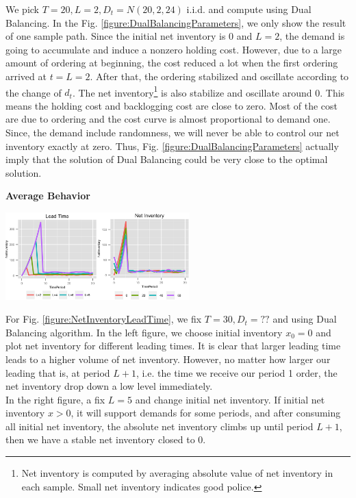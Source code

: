 \documentclass[twoside]{article}
\begin{document}
\begin{multicols}{2}
We pick $T=20,L=2,D_t=N(20,2,24)$ i.i.d. and compute using Dual Balancing. In the Fig. \ref{figure:DualBalancingParameters}, we only show the result of one sample path. Since the initial net inventory is 0 and $L=2$, the demand is going to accumulate and induce a nonzero holding cost. However, due to a large amount of ordering at beginning, the cost reduced a lot when the first ordering arrived at $t=L=2$. After that, the ordering stabilized and oscillate according to the change of $d_t$. The net inventory\footnote{Net inventory is computed by averaging absolute value of net inventory in each sample. Small net inventory indicates good police.} is also stabilize and oscillate around 0. This means the holding cost and backlogging cost are close to zero. Most of the cost are due to ordering and the cost curve is almost proportional to demand one.\\
Since, the demand include randomness, we will never be able to control our net inventory exactly at zero. Thus, Fig. \ref{figure:DualBalancingParameters} actually imply that the solution of Dual Balancing could be very close to the optimal solution.
\begin{center}
  \textbf{Average Behavior}
\end{center}

\begin{center}
  \label{figure:NetInventoryLeadTime}
  \includegraphics[width=2.8in]{figures/NetInventoryLeadTime.png}
\end{center}

For Fig. \ref{figure:NetInventoryLeadTime}, we fix $T=30, D_t=??$ and using Dual Balancing algorithm. In the left figure, we choose initial inventory $x_0 = 0$ and plot net inventory for different leading times. It is clear that larger leading time leads to a higher volume of net inventory. However, no matter how larger our leading that is, at period $L+1$, i.e. the time we receive our period 1 order, the net inventory drop down a low level immediately.\\
In the right figure, a fix $L = 5$ and change initial net inventory. If initial net inventory $x > 0$, it will support demands for some periods, and after consuming all initial net inventory, the absolute net inventory climbs up until period $L+1$, then we have a stable net inventory closed to 0.\\


\end{multicols}
\end{document}
